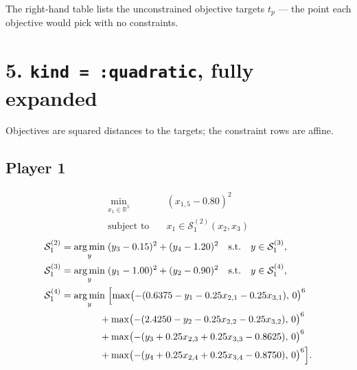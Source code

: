 \documentclass[11pt]{article}
\newcommand{\argmin}{\operatorname*{arg\,min}}
\begin{document}
\noindent
The right-hand table lists the unconstrained objective targets \(t_p\) --- the point each
objective would pick with no constraints.

\section*{5. \texttt{kind = :quadratic}, fully expanded}

Objectives are squared distances to the targets; the constraint rows are affine.

\subsection*{Player 1}
\[
\begin{aligned}
  \min_{x_1 \in \mathbb{R}^5} \quad & (x_{1,5}-0.80)^2 \\
  \text{subject to} \quad & x_1 \in \mathcal{S}_1^{(2)}(x_2,x_3)
\end{aligned}
\]
\[
\begin{aligned}
  \mathcal{S}_1^{(2)} &= \argmin_{y} \;
    (y_3-0.15)^2 + (y_4-1.20)^2
    \quad \text{s.t.} \quad y \in \mathcal{S}_1^{(3)}, \\
  \mathcal{S}_1^{(3)} &= \argmin_{y} \;
    (y_1-1.00)^2 + (y_2-0.90)^2
    \quad \text{s.t.} \quad y \in \mathcal{S}_1^{(4)}, \\
  \mathcal{S}_1^{(4)} &= \argmin_{y} \;
    \Bigl[ \max\bigl(-(0.6375 - y_1 - 0.25x_{2,1} - 0.25x_{3,1}),\,0\bigr)^6 \\
    &\qquad\qquad + \max\bigl(-(2.4250 - y_2 - 0.25x_{2,2} - 0.25x_{3,2}),\,0\bigr)^6 \\
    &\qquad\qquad + \max\bigl(-(y_3 + 0.25x_{2,3} + 0.25x_{3,3} - 0.8625),\,0\bigr)^6 \\
    &\qquad\qquad + \max\bigl(-(y_4 + 0.25x_{2,4} + 0.25x_{3,4} - 0.8750),\,0\bigr)^6 \Bigr].
\end{aligned}
\]
\end{document}
